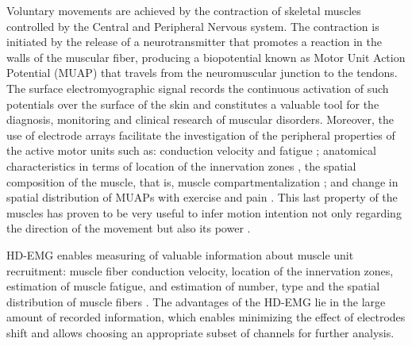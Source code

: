     Voluntary movements are achieved by the contraction of skeletal muscles controlled by the Central and Peripheral Nervous system. The contraction is initiated by the release of a neurotransmitter that promotes a reaction in the walls of the muscular fiber, producing a biopotential known as Motor Unit Action Potential (MUAP) that travels from the neuromuscular junction to the tendons. The surface electromyographic signal records the continuous activation of such potentials over the surface of the skin and constitutes a valuable tool for the diagnosis, monitoring and clinical research of muscular disorders. Moreover, the use of electrode arrays facilitate the investigation of the peripheral properties of the active motor units such as: conduction velocity and fatigue \citep{Soares2015}; anatomical characteristics in terms of location of the innervation zones \citep{Beck2012}, the spatial composition of the muscle, that is, muscle compartmentalization \citep{Vieira2010}; and change in spatial distribution of MUAPs with exercise and pain \citep{Madeleine2006}. This last property of the muscles has proven to be very useful to infer motion intention not only regarding the direction of the movement but also its power \citep{Rojas-Martinez2013}.
    
    HD-EMG enables measuring of valuable information about muscle unit recruitment: muscle fiber conduction velocity, location of the innervation zones, estimation of muscle fatigue, and estimation of number, type and the spatial distribution of muscle fibers \citep{Marateb2016}. The advantages of the HD-EMG lie in the large amount of recorded information, which enables minimizing the effect of electrodes shift and allows choosing an appropriate subset of channels for further analysis.
    
